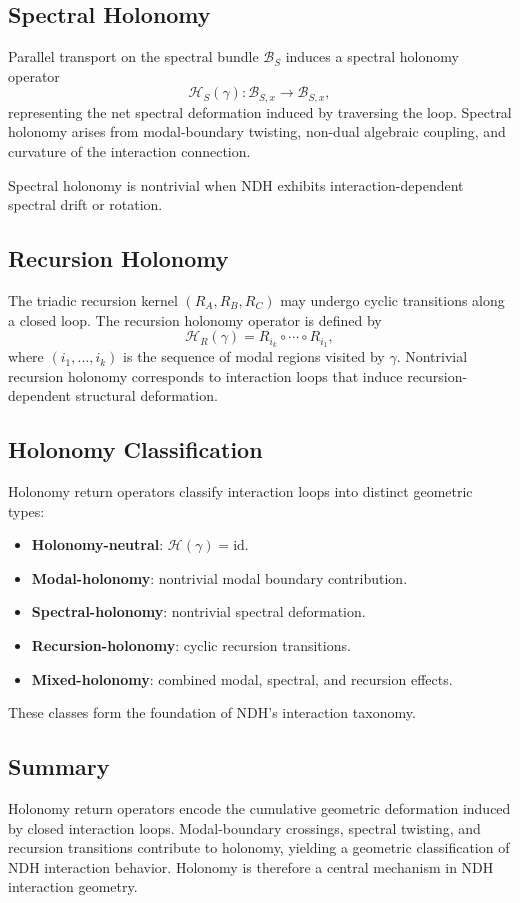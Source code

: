 \subsection{Spectral Holonomy}

Parallel transport on the spectral bundle $\mathcal{B}_S$ induces a spectral
holonomy operator
\[
\mathcal{H}_S(\gamma) : \mathcal{B}_{S,x} \to \mathcal{B}_{S,x},
\]
representing the net spectral deformation induced by traversing the loop.
Spectral holonomy arises from modal-boundary twisting, non-dual algebraic
coupling, and curvature of the interaction connection.

Spectral holonomy is nontrivial when NDH exhibits interaction-dependent spectral
drift or rotation.

\subsection{Recursion Holonomy}

The triadic recursion kernel $(R_A, R_B, R_C)$ may undergo cyclic transitions
along a closed loop. The recursion holonomy operator is defined by
\[
\mathcal{H}_R(\gamma) = R_{i_k} \circ \cdots \circ R_{i_1},
\]
where $(i_1, \dots, i_k)$ is the sequence of modal regions visited by $\gamma$.
Nontrivial recursion holonomy corresponds to interaction loops that induce
recursion-dependent structural deformation.

\subsection{Holonomy Classification}

Holonomy return operators classify interaction loops into distinct geometric
types:

\begin{itemize}
    \item \textbf{Holonomy-neutral}: $\mathcal{H}(\gamma) = \mathrm{id}$.
    \item \textbf{Modal-holonomy}: nontrivial modal boundary contribution.
    \item \textbf{Spectral-holonomy}: nontrivial spectral deformation.
    \item \textbf{Recursion-holonomy}: cyclic recursion transitions.
    \item \textbf{Mixed-holonomy}: combined modal, spectral, and recursion
    effects.
\end{itemize}

These classes form the foundation of NDH's interaction taxonomy.

\subsection{Summary}

Holonomy return operators encode the cumulative geometric deformation induced by
closed interaction loops. Modal-boundary crossings, spectral twisting, and
recursion transitions contribute to holonomy, yielding a geometric
classification of NDH interaction behavior. Holonomy is therefore a central
mechanism in NDH interaction geometry.
